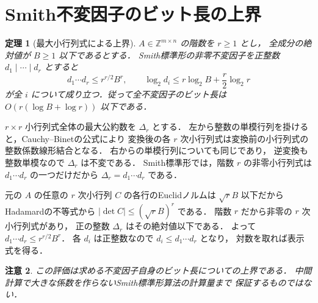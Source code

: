 \documentclass[a5paper,10pt,onecolumn]{jsarticle}
\makeatletter
\theoremstyle{mathnotetheorem}
\newtheorem{theorem}{定理}[section]
\newtheorem{remark}[theorem]{注意}
\renewcommand{\proofname}{証明}
\renewenvironment{proof}[1][\proofname]{%
  \par\pushQED{\qed}\normalfont\topsep4\p@\@plus2\p@\relax
  \trivlist\item[\hskip\labelsep\bfseries #1]\ignorespaces
}{\popQED\endtrivlist\@endpefalse}
\makeatother
\begin{document}
\section{Smith不変因子のビット長の上界}
\begin{theorem}[最大小行列式による上界]
$A\in\mathbb Z^{m\times n}$ の階数を $r\ge1$ とし，
全成分の絶対値が $B\ge1$ 以下であるとする．
Smith標準形の非零不変因子を正整数
$d_1\mid\cdots\mid d_r$ とすると
\[
 d_1\cdots d_r\le r^{r/2}B^r,
 \qquad \log_2d_i\le
 r\log_2 B+\frac r2\log_2r
\]
が全 $i$ について成り立つ．従って全不変因子のビット長は
$O(r(\log B+\log r))$ 以下である．
\end{theorem}
\begin{proof}
$r\times r$ 小行列式全体の最大公約数を $\Delta_r$ とする．
左から整数の単模行列を掛けると，Cauchy--Binetの公式により
変換後の各 $r$ 次小行列式は変換前の小行列式の整数係数線形結合となる．
右からの単模行列についても同じであり，
逆変換も整数単模なので $\Delta_r$ は不変である．
Smith標準形では，階数 $r$ の非零小行列式は
$d_1\cdots d_r$ の一つだけだから $\Delta_r=d_1\cdots d_r$ である．

元の $A$ の任意の $r$ 次小行列 $C$ の各行のEuclidノルムは
$\sqrt r B$ 以下だからHadamardの不等式から
$|\det C|\le(\sqrt r B)^r$ である．
階数 $r$ だから非零の $r$ 次小行列式があり，
正の整数 $\Delta_r$ はその絶対値以下である．
よって $d_1\cdots d_r\le r^{r/2}B^r$．
各 $d_i$ は正整数なので $d_i\le d_1\cdots d_r$ となり，
対数を取れば表示式を得る．
\end{proof}
\begin{remark}
この評価は求める不変因子自身のビット長についての上界である．
中間計算で大きな係数を作らないSmith標準形算法の計算量まで
保証するものではない．
\end{remark}
\end{document}
